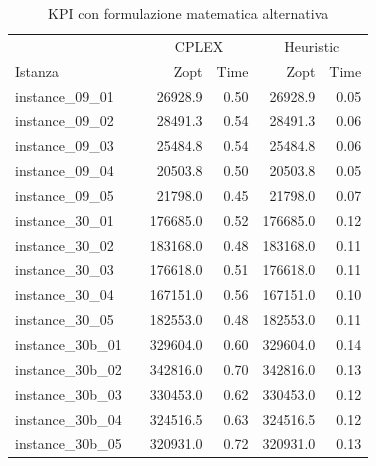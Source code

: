 \documentclass[12pt,a4paper,openright,twoside]{book}
\begin{document}
\begin{table}[H]
\centering
\caption{KPI con formulazione matematica alternativa}
\label{tab.r22}
\small
\begin{tabular}{|ll|rr|rr|} 
\hline

\multicolumn{2}{|c|}{   } & 
\multicolumn{2}{c|}{CPLEX} &     
\multicolumn{2}{c|}{Heuristic} \\  
Istanza        &     &               Zopt &      Time & Zopt &      Time   \\   
\hline
instance\_09\_01                   &     &    26928.9 &     0.50 &    26928.9 &     0.05  \\ 
 instance\_09\_02                   &     &     28491.3 &     0.54 &    28491.3 &     0.06  \\ 
 instance\_09\_03                   &     &     25484.8 &     0.54 &    25484.8 &     0.06  \\ 
 instance\_09\_04                   &     &     20503.8 &     0.50 &    20503.8 &     0.05  \\ 
 instance\_09\_05                   &     &     21798.0 &     0.45 &    21798.0 &     0.07  \\ 
 instance\_30\_01                   &     &    176685.0 &     0.52 &   176685.0 &     0.12  \\ 
 instance\_30\_02                   &     &    183168.0 &     0.48 &   183168.0 &     0.11  \\ 
 instance\_30\_03                   &     &    176618.0 &     0.51 &   176618.0 &     0.11  \\ 
 instance\_30\_04                   &     &    167151.0 &     0.56 &   167151.0 &     0.10  \\ 
 instance\_30\_05                   &     &    182553.0 &     0.48 &   182553.0 &     0.11  \\ 
 instance\_30b\_01                   &     &    329604.0 &     0.60 &   329604.0 &     0.14  \\ 
 instance\_30b\_02                   &     &    342816.0 &     0.70 &   342816.0 &     0.13  \\ 
 instance\_30b\_03                   &     &    330453.0 &     0.62 &   330453.0 &     0.12  \\ 
 instance\_30b\_04                   &     &    324516.5 &     0.63 &   324516.5 &     0.12  \\ 
 instance\_30b\_05                   &     &    320931.0 &     0.72 &   320931.0 &     0.13  \\ 

\end{tabular}
\end{table}
\end{document}
